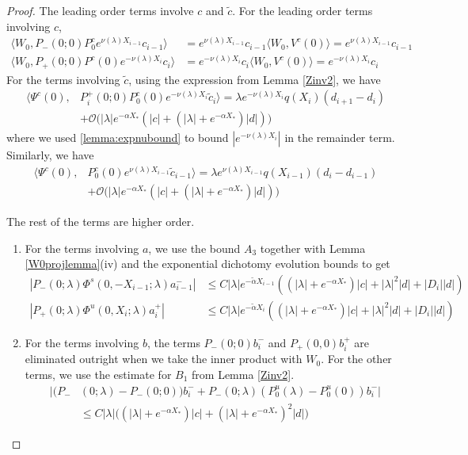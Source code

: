 \documentclass[thesis.tex]{subfiles}
\begin{document}
\begin{lemma}
\begin{proof}
The leading order terms involve $c$ and $\tilde{c}$. For the leading order terms involving $c$, 
\begin{align*}
\langle W_0, P_-(0; 0) P_0^c e^{\nu(\lambda) X_{i-1}} c_{i-1} \rangle &= e^{\nu(\lambda) X_{i-1}} c_{i-1}  \langle W_0, V^c(0) \rangle = e^{\nu(\lambda) X_{i-1}} c_{i-1} \\
\langle W_0, P_+(0; 0) P^c(0) e^{-\nu(\lambda) X_i} c_i \rangle &= e^{-\nu(\lambda) X_i} c_i \langle W_0, V^c(0)  \rangle = e^{-\nu(\lambda) X_i} c_i
\end{align*}
For the terms involving $\tilde{c}$, using the expression from Lemma \ref{Zinv2}, we have
\begin{align*}
\langle \Psi^c(0), &P_i^+(0; 0) P_0^c(0) e^{-\nu(\lambda)X_i} \tilde{c}_i \rangle
= \lambda e^{-\nu(\lambda)X_i} q(X_i) (d_{i+1} - d_i ) \\
&+ \mathcal{O}\Big( |\lambda| e^{-\alpha X_*} \left( |c| + (|\lambda| + e^{-\alpha X_*}) |d| \right) \Big)
\end{align*}
where we used \cref{lemma:expnubound} to bound $|e^{-\nu(\lambda)X_i}|$ in the remainder term. Similarly, we have
\begin{align*}
\langle \Psi^c(0), &P_0^c(0) e^{\nu(\lambda) X_{i-1}} \tilde{c}_{i-1} \rangle = \lambda e^{\nu(\lambda)X_{i-1}} q(X_{i-1}) (d_i - d_{i-1} ) \\
&+ \mathcal{O}\Big( |\lambda| e^{-\alpha X_*} \left( |c| + (|\lambda| + e^{-\alpha X_*}) |d| \right) \Big)
\end{align*}

The rest of the terms are higher order.
\begin{enumerate}

\item For the terms involving $a$, we use the bound $A_3$ together with Lemma \ref{W0projlemma}(iv) and the exponential dichotomy evolution bounds to get
\begin{align*}
|P_-(0; \lambda) \Phi^s(0, -X_{i-1}; \lambda) a_{i-1}^-| &\leq C |\lambda| e^{-\tilde{\alpha} X_{i-1}} \left( (|\lambda| + e^{-\alpha X_*})|c| + |\lambda|^2 |d| + |D_i||d| \right) \\
|P_+(0; \lambda) \Phi^u(0, X_i; \lambda) a_i^+| &\leq C |\lambda| e^{-\tilde{\alpha} X_i}\left( (|\lambda| + e^{-\alpha X_*})|c| + |\lambda|^2 |d| + |D_i||d| \right) 
\end{align*} 

\item For the terms involving $b$, the terms $P_-(0; 0) b_i^-$ and $P_+(0, 0)b_i^+$ are eliminated outright when we take the inner product with $W_0$. For the other terms, we use the estimate for $B_1$ from Lemma \ref{Zinv2}.
\begin{align*}
|(P_-&(0; \lambda) - P_-(0; 0))b_i^- + P_-(0; \lambda)(P_0^u(\lambda) - P_0^u(0))b_i^-| \\
&\leq C |\lambda|\Big( (|\lambda| + e^{-\alpha X_*})|c| + (|\lambda| + e^{-\alpha X_*})^2 |d| \Big)
\end{align*}


\end{enumerate}
\end{proof}
\end{lemma}
\end{document}
